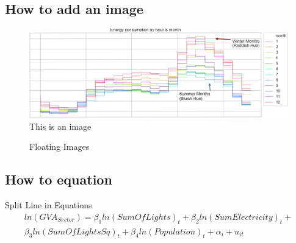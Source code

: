 \subsection*{How to add an image}

\begin{figure}[!ht]
	\centering
	\includegraphics[width=\textwidth]{images/testimage1}
	\caption{This is an image}
	\label{fig:testimage1}
\end{figure}

\begin{figure}[!ht]
	\centering
	\caption{Floating Images}%
	\label{fig:floatimage}%
\end{figure}

\subsection*{How to equation}

Split Line in Equations
\begin{equation}
\begin{split}
\label{eqn:natsec}
ln(GVA_{Sector}) = \beta_1ln(SumOfLights)_{t}+\beta_2ln(SumElectricity)_t +\\ \beta_3ln(SumOfLightsSq)_{t} + \beta_4ln(Population)_{t} +
\alpha_i + u_{it}
\end{split}
\end{equation}

